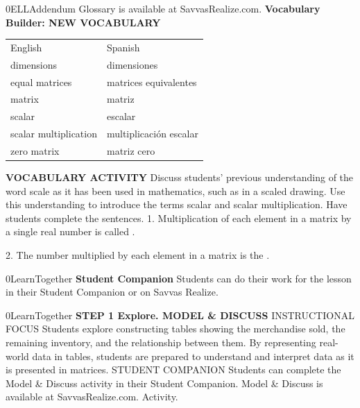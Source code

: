 \documentclass{article}
\newenvironment{te-addendum}[2]{}{}     %
\newcommand{\answer}[1]{}               %
\newcommand{\placeholder}[2]{}          %
\begin{document}
\begin{te-addendum}{0}{ELLAddendum}
Glossary is available at SavvasRealize.com.
\textbf{Vocabulary Builder: NEW VOCABULARY}
\begin{tabular}{ll}
English & Spanish \\
dimensions & dimensiones \\
equal matrices & matrices equivalentes \\
matrix & matriz \\
scalar & escalar \\
scalar multiplication & multiplicación escalar \\
zero matrix & matriz cero \\
\end{tabular}
\textbf{VOCABULARY ACTIVITY}
Discuss students' previous understanding of the word scale as it has been used in mathematics, such as in a scaled drawing. Use this understanding to introduce the terms scalar and scalar multiplication. Have students complete the sentences.
1. Multiplication of each element in a matrix by a single real number is called \underline{\hspace{1cm}}.
\answer{scalar multiplication}
2. The number multiplied by each element in a matrix is the \underline{\hspace{1cm}}.
\answer{scalar}
\end{te-addendum}
\begin{te-addendum}{0}{LearnTogether}
\textbf{Student Companion}
Students can do their work for the lesson in their Student Companion or on Savvas Realize.
\placeholder{illustration}{Student Companion cover: enVision Algebra 2, SAVVAS; purple and blue circular abstract artwork on black.}
\end{te-addendum}
\begin{te-addendum}{0}{LearnTogether}
\textbf{STEP 1 Explore. MODEL \& DISCUSS}
INSTRUCTIONAL FOCUS Students explore constructing tables showing the merchandise sold, the remaining inventory, and the relationship between them. By representing real-world data in tables, students are prepared to understand and interpret data as it is presented in matrices.
STUDENT COMPANION Students can complete the Model \& Discuss activity in their Student Companion.
Model \& Discuss is available at SavvasRealize.com. Activity.
\end{te-addendum}
\end{document}
